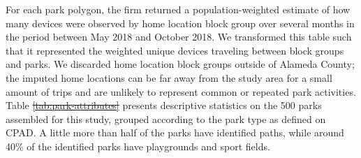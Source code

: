\documentclass[3p, authoryear, review, doubleblind]{elsarticle} %
\providecommand{\DIFaddtex}[1]{{\protect\color{blue}\uwave{#1}}} %
\providecommand{\DIFdeltex}[1]{{\protect\color{red}\sout{#1}}}                      %
\providecommand{\DIFaddbegin}{} %
\providecommand{\DIFaddend}{} %
\providecommand{\DIFdelbegin}{} %
\providecommand{\DIFdelend}{} %
\providecommand{\DIFadd}[1]{\texorpdfstring{\DIFaddtex{#1}}{#1}} %
\providecommand{\DIFdel}[1]{\texorpdfstring{\DIFdeltex{#1}}{}} %
\newcommand{\DIFscaledelfig}{0.5}
\newlength{\DIFdelgraphicswidth} %
\newlength{\DIFdelgraphicsheight} %
\newcommand{\DIFaddincludegraphics}[2][]{{\color{blue}\fbox{\DIFOincludegraphics[#1]{#2}}}} %
\newcommand{\DIFdelincludegraphics}[2][]{%
\sbox{\DIFdelgraphicsbox}{\DIFOincludegraphics[#1]{#2}}%
\settoboxwidth{\DIFdelgraphicswidth}{\DIFdelgraphicsbox} %
\settoboxtotalheight{\DIFdelgraphicsheight}{\DIFdelgraphicsbox} %
\scalebox{\DIFscaledelfig}{%
\parbox[b]{\DIFdelgraphicswidth}{\usebox{\DIFdelgraphicsbox}\\[-\baselineskip] \rule{\DIFdelgraphicswidth}{0em}}\llap{\resizebox{\DIFdelgraphicswidth}{\DIFdelgraphicsheight}{%
\setlength{\unitlength}{\DIFdelgraphicswidth}%
\begin{picture}(1,1)%
\thicklines\linethickness{2pt} %
{\color[rgb]{1,0,0}\put(0,0){\framebox(1,1){}}}%
{\color[rgb]{1,0,0}\put(0,0){\line( 1,1){1}}}%
{\color[rgb]{1,0,0}\put(0,1){\line(1,-1){1}}}%
\end{picture}%
}\hspace*{3pt}}} %
} %
\DeclareRobustCommand{\DIFaddbegin}{\DIFOaddbegin \let\includegraphics\DIFaddincludegraphics} %
\DeclareRobustCommand{\DIFaddend}{\DIFOaddend \let\includegraphics\DIFOincludegraphics} %
\DeclareRobustCommand{\DIFdelbegin}{\DIFOdelbegin \let\includegraphics\DIFdelincludegraphics} %
\DeclareRobustCommand{\DIFdelend}{\DIFOaddend \let\includegraphics\DIFOincludegraphics} %
\begin{document}
For each park polygon, the firm returned a population-weighted estimate of how
many devices were observed by home location block group over several months in
the period between May 2018 and October 2018. We transformed this table such
that it represented the weighted unique devices traveling between block groups
and parks. We discarded home location block groups outside of Alameda County;
the imputed home locations can be far away from the study area for a small
amount of trips and are unlikely to represent common or repeated park
activities. Table \DIFdelbegin \DIFdel{\ref{tab:park-attributes} }\DIFdelend \DIFaddbegin \DIFadd{\ref{tab:parkstable} }\DIFaddend presents descriptive statistics on
the 500 parks assembled for this study, grouped according to the
park type as defined on CPAD. A little more than half of the parks have
identified paths, while around 40\% of the identified parks have playgrounds and
sport fields.
\end{document}
